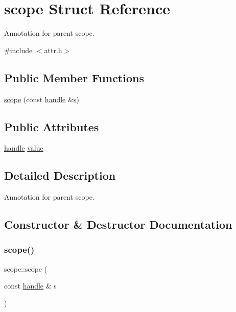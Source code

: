 \hypertarget{structscope}{}\section{scope Struct Reference}
\label{structscope}


Annotation for parent scope.  




{\ttfamily \#include $<$attr.\+h$>$}

\subsection*{Public Member Functions}
\begin{DoxyCompactItemize}
\item 
\mbox{\hyperlink{structscope_a5849bb2d6e0946e419e2f42f5273943d}{scope}} (const \mbox{\hyperlink{classhandle}{handle}} \&\mbox{\hyperlink{_s_d_l__opengl_8h_a4af680a6c683f88ed67b76f207f2e6e4}{s}})
\end{DoxyCompactItemize}
\subsection*{Public Attributes}
\begin{DoxyCompactItemize}
\item 
\mbox{\hyperlink{classhandle}{handle}} \mbox{\hyperlink{structscope_a3e53212de1c4692bf00cdba2e613458e}{value}}
\end{DoxyCompactItemize}


\subsection{Detailed Description}
Annotation for parent scope. 

\subsection{Constructor \& Destructor Documentation}
\mbox{\label{structscope_a5849bb2d6e0946e419e2f42f5273943d}} 
\subsubsection{\texorpdfstring{scope()}{scope()}}
{\footnotesize\ttfamily scope\+::scope (\begin{DoxyParamCaption}\item[{const \mbox{\hyperlink{classhandle}{handle}} \&}]{s }\end{DoxyParamCaption})\hspace{0.3cm}{\ttfamily [inline]}}



